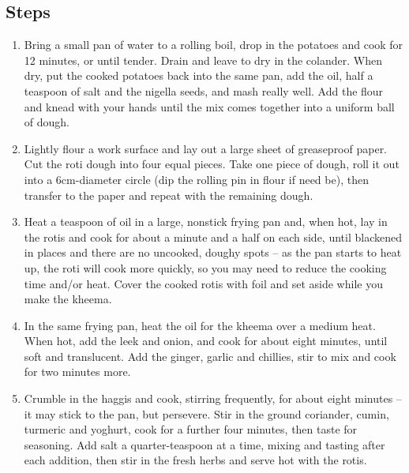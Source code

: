 \documentclass{book}
\begin{document}
\subsection*{Steps}
\begin{enumerate}
\item Bring a small pan of water to a rolling boil, drop in the potatoes and cook for 12 minutes, or until tender. Drain and leave to dry in the colander. When dry, put the cooked potatoes back into the same pan, add the oil, half a teaspoon of salt and the nigella seeds, and mash really well. Add the flour and knead with your hands until the mix comes together into a uniform ball of dough.
\item Lightly flour a work surface and lay out a large sheet of greaseproof paper. Cut the roti dough into four equal pieces. Take one piece of dough, roll it out into a 6cm-diameter circle (dip the rolling pin in flour if need be), then transfer to the paper and repeat with the remaining dough.
\item Heat a teaspoon of oil in a large, nonstick frying pan and, when hot, lay in the rotis and cook for about a minute and a half on each side, until blackened in places and there are no uncooked, doughy spots – as the pan starts to heat up, the roti will cook more quickly, so you may need to reduce the cooking time and/or heat. Cover the cooked rotis with foil and set aside while you make the kheema.
\item In the same frying pan, heat the oil for the kheema over a medium heat. When hot, add the leek and onion, and cook for about eight minutes, until soft and translucent. Add the ginger, garlic and chillies, stir to mix and cook for two minutes more.
\item Crumble in the haggis and cook, stirring frequently, for about eight minutes – it may stick to the pan, but persevere. Stir in the ground coriander, cumin, turmeric and yoghurt, cook for a further four minutes, then taste for seasoning. Add salt a quarter-teaspoon at a time, mixing and tasting after each addition, then stir in the fresh herbs and serve hot with the rotis.
\end{enumerate}
\newpage
\end{document}
